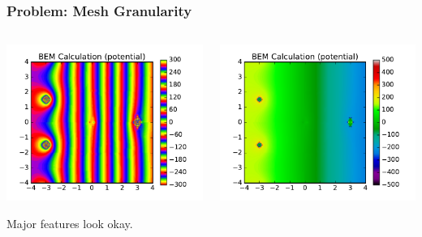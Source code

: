 \documentclass[xcolor=dvipsnames]{beamer}
\begin{document}
\begin{frame}
  \frametitle{Problem: Mesh Granularity}

  \vspace{-5mm}

  \begin{columns}
    \begin{column}{0.5\textwidth}
      \begin{center}
        \includegraphics[height=0.6\textheight]{fluctuations1.pdf}

        \scriptsize Major features look okay.
      \end{center}
    \end{column}
    \begin{column}{0.5\textwidth}
      \begin{center}
        \includegraphics[height=0.6\textheight]{fluctuations2.pdf}


\end{center}
\end{column}
\end{columns}
\end{frame}
\end{document}
